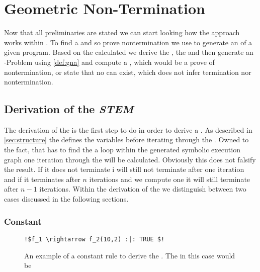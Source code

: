 \chapter{Geometric Non-Termination}

Now that all preliminaries are stated we can start looking how the approach works within \aprove. To find a \gna and so prove nontermination we use \aprove to generate an \its of a given program. %
Based on the calculated \its we derive the \stem, the \loopt and then generate an -Problem using \autoref{def:gna} and compute a \gna, which would be a prove of nontermination, or state that no \gna can exist, which does not infer termination nor nontermination.

\section{Derivation of the \emph{STEM}}
\label{sec:stem}
The derivation of the \stem is the first step to do in order to derive a \gna. As described in \autoref{sec:structure} the \stem defines the variables before iterating through the \loopt.  Owned to the fact, that \aprove has to find the a loop within the generated symbolic execution graph %
one iteration through the \loopt will be calculated. Obviously this does not falsify the result. If it does not terminate i will still not terminate after one iteration and if it terminates after $n$ iterations and we compute one it will still terminate after $n-1$ iterations. \newline
Within the derivation of the \stem we distinguish between two cases discussed in the following sections.

\subsection{Constant \stem}
\label{sec:stem-const}

\newsavebox{\stemexone}%
\begin{wrapfigure}{r}{0.6\textwidth}
	\begin{lstlisting}[escapechar=!]
	!$f_1 \rightarrow f_2(10,2) :|: TRUE $!
	\end{lstlisting}	
	\caption{An example of a constant \its rule to derive the \stem. The \stem in this case would be \usebox{\stemexone} }
	\label{lst:stem-cons}
\end{wrapfigure}

